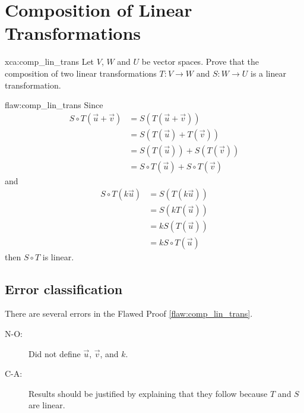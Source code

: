 \section{Composition of Linear Transformations}

\begin{xca}{xca:comp_lin_trans}
Let $V$, $W$ and $U$ be vector spaces. Prove that the composition of two linear transformations $T:V \rightarrow W$ and $S: W \rightarrow U$ is a linear transformation.
\end{xca}

\begin{flaw}{flaw:comp_lin_trans} %
Since
\begin{align*}
    S \circ T(\vec{u} + \vec{v}) &= S(T(\vec{u} + \vec{v})) \\
    &= S(T(\vec{u}) + T(\vec{v})) \\
    &= S(T(\vec{u})) + S(T(\vec{v}))\\
    &= S \circ T(\vec{u}) + S \circ T(\vec{v})
\end{align*}
and
\begin{align*}
    S \circ T(k\vec{u}) &= S(T(k\vec{u})) \\
    &= S(kT(\vec{u})) \\
    &= kS(T(\vec{u})) \\
    &= kS \circ T(\vec{u})
\end{align*}
then $S \circ T$ is linear.
\end{flaw}

\clearpage
\subsection{Error classification}


There are several errors
 in the Flawed Proof \ref{flaw:comp_lin_trans}. %


 \begin{description}
 	\item[N-O:] Did not define $\vec{u}$, $\vec{v}$, and $k$.	
 	\item[C-A:] Results should be justified by explaining that they follow because $T$ and $S$ are linear.
 \end{description}


